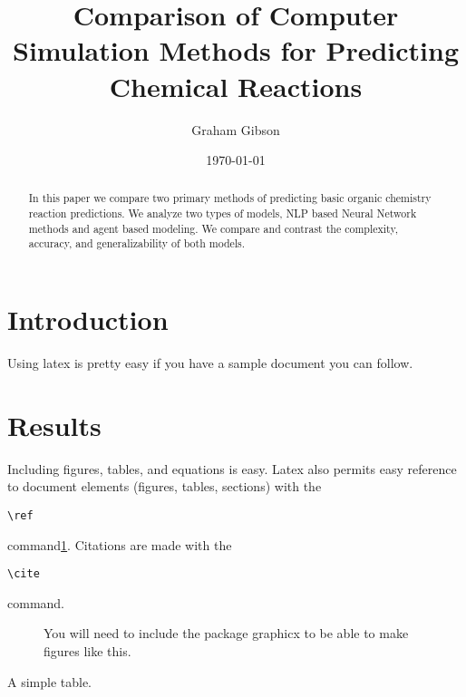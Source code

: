 \documentclass[aps,floatfix,prd,showpacs]{revtex4}
\begin{document}
\title{Comparison of Computer Simulation Methods for Predicting Chemical Reactions}
\author{Graham Gibson}

\date{\today}

\begin{abstract}
In this paper we compare two primary methods of predicting basic organic chemistry reaction predictions. We analyze two types of models, NLP based Neural Network methods and agent based modeling. We compare and contrast the complexity, accuracy, and generalizability of both models.  
\end{abstract}
\maketitle

\section{Introduction}

Using latex is pretty easy if you have a sample document you can follow.

\section{Results}
Including figures, tables, and equations is easy. Latex also permits easy reference to document elements (figures, tables, sections) with the \begin{verbatim}\ref\end{verbatim} command\ref{fig1}. Citations are made with the \begin{verbatim}\cite\end{verbatim} command\cite{lamport}. 

\begin{figure}[ht]
\caption{You will need to include the package graphicx to be able to make figures like this.}
\label{fig1}
\end{figure}

A simple table.
\end{document}
